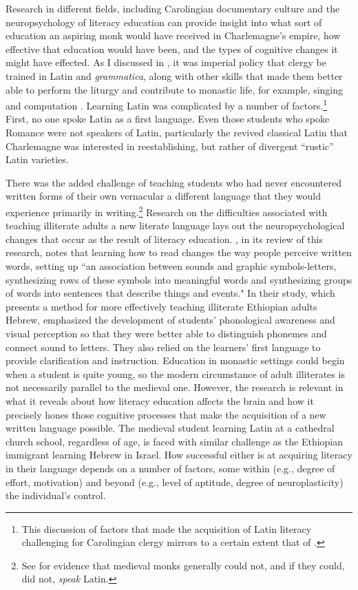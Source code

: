 Research in different fields, including Carolingian documentary culture and the neuropsychology of literacy education can provide insight into what sort of education an aspiring monk would have received in Charlemagne’s empire, how effective that education would have been, and the types of cognitive changes it might have effected. As I discussed in , it was imperial policy that clergy be trained in Latin and \textit{grammatica}, along with other skills that made them better able to perform the liturgy and contribute to monastic life, for example, singing and computation \citep[19]{Brown1994}. Learning Latin was complicated by a number of factors.\footnote{\textrm{This discussion of factors that made the acquisition of Latin literacy challenging for Carolingian clergy mirrors to a certain extent that of \citet[88]{Law1994}.} } First, no one spoke Latin as a first language. Even those students who spoke Romance were not speakers of Latin, particularly the revived classical Latin that Charlemagne was interested in reestablishing, but rather of divergent “rustic” Latin varieties.

There was the added challenge of teaching students who had never encountered written forms of their own vernacular a different language that they would experience primarily in writing.\footnote{\textrm{See \citet{Barrau2011} for evidence that medieval monks generally could not, and if they could, did not,} \textrm{\textit{speak}} \textrm{Latin.} } Research on the difficulties associated with teaching illiterate adults a new literate language lays out the neuropsychological changes that occur as the result of literacy education. \citet[496]{Kotik-friedgut2014}, in its review of this research, notes that learning how to read changes the way people perceive written words, setting up “an association between sounds and graphic symbols-letters, synthesizing rows of these symbols into meaningful words and synthesizing groups of words into sentences that describe things and events." In their study, which presents a method for more effectively teaching illiterate Ethiopian adults Hebrew, \citet[498]{Kotik-friedgut2014} emphasized the development of students’ phonological awareness and visual perception so that they were better able to distinguish phonemes and connect sound to letters. They also relied on the learners’ first language to provide clarification and instruction. Education in monastic settings could begin when a student is quite young, so the modern circumstance of adult illiterates is not necessarily parallel to the medieval one. However, the research is relevant in what it reveals about how literacy education affects the brain and how it precisely hones those cognitive processes that make the acquisition of a new written language possible. The medieval student learning Latin at a cathedral church school, regardless of age, is faced with similar challenge as the Ethiopian immigrant learning Hebrew in Israel. How successful either is at acquiring literacy in their language depends on a number of factors, some within (e.g., degree of effort, motivation) and beyond (e.g., level of aptitude, degree of neuroplasticity) the individual’s control.

